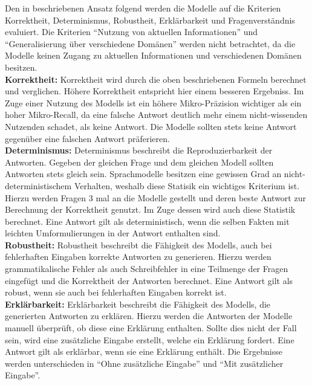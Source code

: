 Den in \citet{chatgpt_qas} beschriebenen Ansatz folgend werden die Modelle auf die Kriterien Korrektheit, Determinismus, Robustheit, Erklärbarkeit und Fragenverständnis evaluiert.
Die Kriterien \enquote{Nutzung von aktuellen Informationen} und \enquote{Generalisierung über verschiedene Domänen} werden nicht betrachtet, da die Modelle keinen Zugang zu aktuellen Informationen und verschiedenen Domänen besitzen.\\

\noindent\textbf{Korrektheit:}\newline
Korrektheit wird durch die oben beschriebenen Formeln berechnet und verglichen.
Höhere Korrektheit entspricht hier einem besseren Ergebniss.
Im Zuge einer Nutzung des Modells ist ein höhere Mikro-Präzision wichtiger als ein hoher Mikro-Recall, da eine falsche Antwort deutlich mehr einem nicht-wissenden Nutzenden schadet, als keine Antwort.
Die Modelle sollten stets keine Antwort gegenüber eine falschen Antwort präferieren.\\

\noindent\textbf{Determinismus:}\newline
Determinismus beschreibt die Reproduzierbarkeit der Antworten.
Gegeben der gleichen Frage und dem gleichen Modell sollten Antworten stets gleich sein.
Sprachmodelle besitzen eine gewissen Grad an nicht-deterministischem Verhalten, weshalb diese Statisik ein wichtiges Kriterium ist.
Hierzu werden Fragen 3 mal an die Modelle gestellt und deren beste Antwort zur Berechnung der Korrektheit genutzt.
Im Zuge dessen wird auch diese Statistik berechnet.
Eine Antwort gilt als deterministisch, wenn die selben Fakten mit leichten Umformulierungen in der Antwort enthalten sind.\\

\noindent\textbf{Robustheit:}\newline
Robustheit beschreibt die Fähigkeit des Modells, auch bei fehlerhaften Eingaben korrekte Antworten zu generieren.
Hierzu werden grammatikalische Fehler als auch Schreibfehler in eine Teilmenge der Fragen eingefügt und die Korrektheit der Antworten berechnet.
Eine Antwort gilt als robust, wenn sie auch bei fehlerhaften Eingaben korrekt ist.\\

\noindent\textbf{Erklärbarkeit:}\newline
Erklärbarkeit beschreibt die Fähigkeit des Modells, die generierten Antworten zu erklären.
Hierzu werden die Antworten der Modelle manuell überprüft, ob diese eine Erklärung enthalten.
Sollte dies nicht der Fall sein, wird eine zusätzliche Eingabe erstellt, welche ein Erklärung fordert.
Eine Antwort gilt als erklärbar, wenn sie eine Erklärung enthält.
Die Ergebnisse werden unterschieden in \enquote{Ohne zusätzliche Eingabe} und \enquote{Mit zusätzlicher Eingabe}.\\

